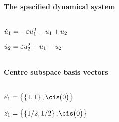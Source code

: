 
\(\)
\paragraph{The specified dynamical system}
\(
\)\par

\(\dot u_{1}=-\varepsilon u\sb1^{2}-u\sb1+u\sb2
\)\par

\(\dot u_{2}=\varepsilon u\sb2^{2}+u\sb1-u\sb2
\)\par

\(\)
\paragraph{Centre subspace basis vectors}
\(
\)\par

\(\vec e_{1}=\left\{
\left\{
1 , 1
\right\} , \cis\big(0\big)
\right\}
\)\par

\(\vec z_{1}=\left\{
\left\{
1/2 , 1/2
\right\} , \cis\big(0\big)
\right\}
\)\par
